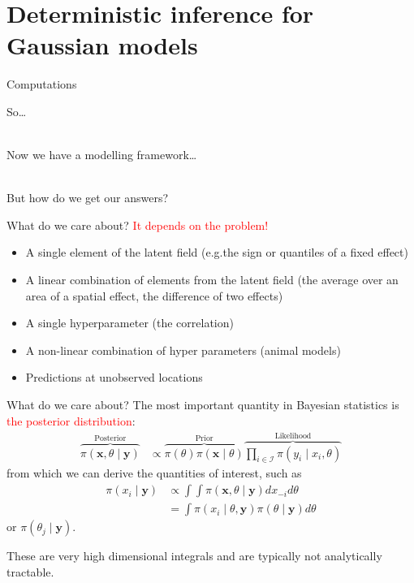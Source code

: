\documentclass[
  ignorenonframetext,
]{beamer}
\providecommand{\tightlist}{%
  \setlength{\itemsep}{0pt}\setlength{\parskip}{0pt}}
\begin{document}
\hypertarget{deterministic-inference-for-gaussian-models}{%
\section{Deterministic inference for Gaussian
models}\label{deterministic-inference-for-gaussian-models}}

\begin{frame}{Computations}
\protect\hypertarget{computations}{}
\Large

\hfill\break
\hfill\break
So\ldots{}\\
\strut \\
Now we have a modelling framework\ldots{}\\
\strut \\
But how do we get our answers? \normalsize
\end{frame}

\begin{frame}{What do we care about?}
\protect\hypertarget{what-do-we-care-about}{}
\textcolor{red}{It depends on the problem!}

\begin{itemize}[<+->]
\tightlist
\item
  A single element of the latent field (e.g.the sign or quantiles of a
  fixed effect)
\item
  A linear combination of elements from the latent field (the average
  over an area of a spatial effect, the difference of two effects)
\item
  A single hyperparameter (the correlation)
\item
  A non-linear combination of hyper parameters (animal models)
\item
  Predictions at unobserved locations
\end{itemize}
\end{frame}

\begin{frame}{What do we care about?}
\protect\hypertarget{what-do-we-care-about-1}{}
The most important quantity in Bayesian statistics is
\textcolor{red}{the posterior distribution}: \[
\begin{aligned}
\overbrace{\pi(\mathbf{x}, {\theta}\mid\mathbf{y})}^{{\text{Posterior}}} &\propto \overbrace{\pi({\theta}) \pi(\mathbf{x}\mid{\theta})}^{{\text{Prior}}} \overbrace{\prod_{i \in \mathcal{I}}\pi(y_i \mid x_i, {\theta})}^{{\text{Likelihood}}}
\end{aligned}
\] from which we can derive the quantities of interest, such as \[
    \begin{aligned}
        {\pi(x_i \mid \mathbf{y})} &\propto \int \int \pi(\mathbf{x}, {\theta}\mid\mathbf{y}) d{x}_{-i} d{\theta}\\
        &= {\int \pi(x_i \mid {\theta}, \mathbf{y}) \pi({\theta} \mid \mathbf{y}) d{\theta}}
    \end{aligned}
\] or \(\pi(\theta_j\mid \mathbf{y})\).

These are very high dimensional integrals and are typically not
analytically tractable.
\end{frame}
\end{document}
